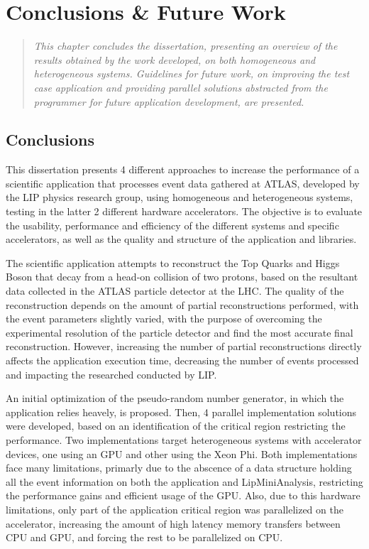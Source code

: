 \chapter{Conclusions \& Future Work}
\label{ConclusionFutureWork}

\begin{quote}
\textit{This chapter concludes the dissertation, presenting an overview of the results obtained by the work developed, on both homogeneous and heterogeneous systems. Guidelines for future work, on improving the test case application and providing parallel solutions abstracted from the programmer for future application development, are presented.}
\end{quote}

\section{Conclusions}
\label{Conclusion}

This dissertation presents 4 different approaches to increase the performance of a scientific application that processes event data gathered at ATLAS, developed by the LIP physics research group, using homogeneous and heterogeneous systems, testing in the latter 2 different hardware accelerators. The objective is to evaluate the usability, performance and efficiency of the different systems and specific accelerators, as well as the quality and structure of the application and libraries.

The scientific application attempts to reconstruct the Top Quarks and Higgs Boson that decay from a head-on collision of two protons, based on the resultant data collected in the ATLAS particle detector at the LHC. The quality of the reconstruction depends on the amount of partial reconstructions performed, with the event parameters slightly varied, with the purpose of overcoming the experimental resolution of the particle detector and find the most accurate final reconstruction. However, increasing the number of partial reconstructions directly affects the application execution time, decreasing the number of events processed and impacting the researched conducted by LIP.

An initial optimization of the pseudo-random number generator, in which the application relies heavely, is proposed. Then, 4 parallel implementation solutions were developed, based on an identification of the critical region restricting the performance. Two implementations target heterogeneous systems with accelerator devices, one using an \nvidia GPU and other using the \intel Xeon Phi. Both implementations face many limitations, primarly due to the abscence of a data structure holding all the event information on both the application and LipMiniAnalysis, restricting the performance gains and efficient usage of the GPU. Also, due to this hardware limitations, only part of the application critical region was parallelized on the accelerator, increasing the amount of high latency memory transfers between CPU and GPU, and forcing the rest to be parallelized on CPU.

